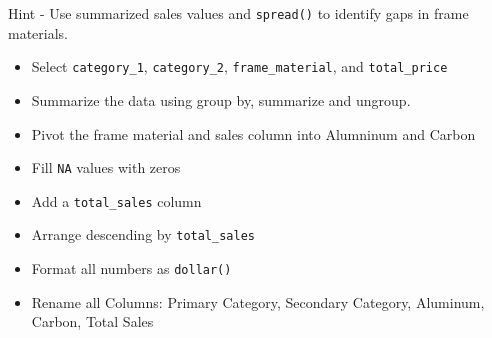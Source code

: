 \documentclass[]{article}
\newenvironment{Shaded}{\begin{snugshade}}{\end{snugshade}}
\newcommand{\DataTypeTok}[1]{\textcolor[rgb]{0.13,0.29,0.53}{#1}}
\newcommand{\DecValTok}[1]{\textcolor[rgb]{0.00,0.00,0.81}{#1}}
\newcommand{\KeywordTok}[1]{\textcolor[rgb]{0.13,0.29,0.53}{\textbf{#1}}}
\newcommand{\NormalTok}[1]{#1}
\newcommand{\OperatorTok}[1]{\textcolor[rgb]{0.81,0.36,0.00}{\textbf{#1}}}
\newcommand{\StringTok}[1]{\textcolor[rgb]{0.31,0.60,0.02}{#1}}
\providecommand{\tightlist}{%
  \setlength{\itemsep}{0pt}\setlength{\parskip}{0pt}}
\begin{document}
Hint - Use summarized sales values and \texttt{spread()} to identify
gaps in frame materials.

\begin{itemize}
\tightlist
\item
  Select \texttt{category\_1}, \texttt{category\_2},
  \texttt{frame\_material}, and \texttt{total\_price}
\item
  Summarize the data using group by, summarize and ungroup.
\item
  Pivot the frame material and sales column into Alumninum and Carbon
\item
  Fill \texttt{NA} values with zeros
\item
  Add a \texttt{total\_sales} column
\item
  Arrange descending by \texttt{total\_sales}
\item
  Format all numbers as \texttt{dollar()}
\item
  Rename all Columns: Primary Category, Secondary Category, Aluminum,
  Carbon, Total Sales
\end{itemize}

\begin{Shaded}
\end{Shaded}
\end{document}
